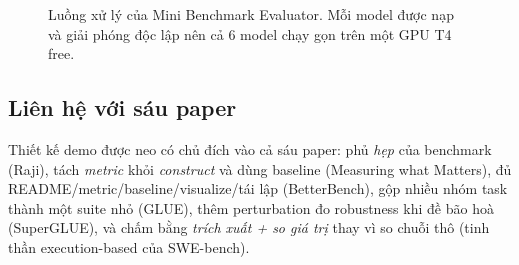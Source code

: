 \begin{figure}[t]
  \centering
  \caption{Luồng xử lý của Mini Benchmark Evaluator. Mỗi model được nạp và giải
  phóng độc lập nên cả 6 model chạy gọn trên một GPU T4 free.}
  \label{fig:arch}
\end{figure}

\subsection{Liên hệ với sáu paper}

Thiết kế demo được neo có chủ đích vào cả sáu paper: phủ \emph{hẹp} của benchmark
(Raji), tách \emph{metric} khỏi \emph{construct} và dùng baseline (Measuring what
Matters), đủ README/metric/baseline/visualize/tái lập (BetterBench), gộp nhiều
nhóm task thành một suite nhỏ (GLUE), thêm perturbation đo robustness khi đề bão
hoà (SuperGLUE), và chấm bằng \emph{trích xuất + so giá trị} thay vì so chuỗi thô
(tinh thần execution-based của SWE-bench).
